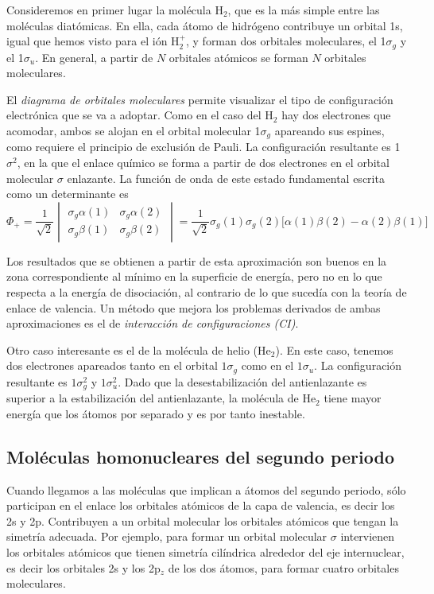\documentclass{tufte-handout}
\begin{document}
Consideremos en primer lugar la molécula H$_2$, que es la más
simple entre las moléculas diatómicas. En ella, cada átomo de
hidrógeno contribuye un orbital 1s, igual que hemos visto para
el ión H$_2^+$, y forman dos orbitales moleculares, el 
1$\sigma_g$ y el 1$\sigma_u$. En general, a partir de $N$ 
orbitales atómicos se forman $N$ orbitales moleculares.

El \textit{diagrama de orbitales moleculares} 
permite visualizar el tipo de configuración electrónica que se
va a adoptar. Como en el caso del H$_2$ hay dos electrones
que acomodar, ambos se alojan en el orbital molecular 1$\sigma_g$
apareando sus espines, como requiere el principio de exclusión
de Pauli. La configuración resultante es 1$\sigma^2$, en la
que el enlace químico se forma a partir de dos electrones en el
orbital molecular $\sigma$ enlazante. La función de onda de 
este estado fundamental escrita como un determinante es
\begin{equation}
   \Phi_+ =
   \frac{1}{\sqrt{2}}
   \begin{vmatrix}
\sigma_g\alpha(1) & \sigma_g\alpha(2) \\ 
\sigma_g\beta(1) & \sigma_g\beta(2) 
\end{vmatrix}=
\frac{1}{\sqrt{2}}\sigma_g(1)\sigma_g(2)\big[\alpha(1)\beta(2)-\alpha(2)\beta(1)\big]
\end{equation}

Los resultados que se obtienen a partir de esta aproximación 
son buenos en la zona correspondiente al mínimo en la superficie
de energía, pero no
en lo que respecta a la energía de disociación, al contrario
de lo que sucedía con la teoría de enlace de valencia.
Un método que mejora los problemas derivados de ambas 
aproximaciones es el de \textit{interacción de configuraciones (CI)}.

Otro caso interesante es el de la molécula de helio (He$_2$). 
En este caso, tenemos dos electrones apareados tanto en
el orbital $1\sigma_g$ como en el $1\sigma_u$. La configuración
resultante es $1\sigma_g^2$ y $1\sigma_u^2$. Dado que la 
desestabilización del antienlazante es superior a la
estabilización del antienlazante, la molécula de He$_2$ 
tiene mayor energía que los átomos por separado y es por
tanto inestable.

\subsection{Moléculas homonucleares del segundo periodo}
Cuando llegamos a las moléculas que implican a átomos del
segundo periodo, sólo participan en el enlace los orbitales
atómicos de la capa de valencia, es decir los 2s y 2p.
Contribuyen a un orbital molecular los orbitales atómicos
que tengan la simetría adecuada. Por ejemplo, para formar
un orbital molecular $\sigma$ intervienen los orbitales
atómicos que tienen simetría cilíndrica alrededor del eje
internuclear, es decir los orbitales 2s y los 2p$_z$ de 
los dos átomos, para formar cuatro orbitales moleculares.
\end{document}
